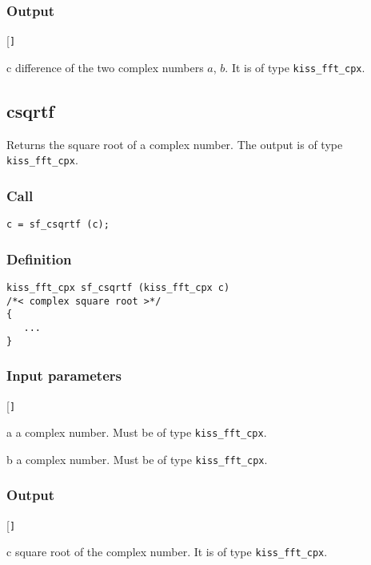 \subsubsection*{Output}
\begin{desclist}{\tt }{\quad}[\tt ]
   \setlength\itemsep{0pt}
   \item[c] difference of the two complex numbers $a$, $b$. It is of type \texttt{kiss\_fft\_cpx}.
\end{desclist}




\subsection{{csqrtf}}
Returns the square root of a complex number. The output is of type \texttt{kiss\_fft\_cpx}.

\subsubsection*{Call}
\begin{verbatim}c = sf_csqrtf (c);\end{verbatim}

\subsubsection*{Definition}
\begin{verbatim}
kiss_fft_cpx sf_csqrtf (kiss_fft_cpx c)
/*< complex square root >*/
{
   ...
}
\end{verbatim}

\subsubsection*{Input parameters}
\begin{desclist}{\tt }{\quad}[\tt ]
   \setlength\itemsep{0pt}
   \item[a] a complex number. Must be of type \texttt{kiss\_fft\_cpx}.
   \item[b] a complex number. Must be of type \texttt{kiss\_fft\_cpx}.
\end{desclist}

\subsubsection*{Output}
\begin{desclist}{\tt }{\quad}[\tt ]
   \setlength\itemsep{0pt}
   \item[c] square root of the complex number. It is of type \texttt{kiss\_fft\_cpx}.
\end{desclist}




